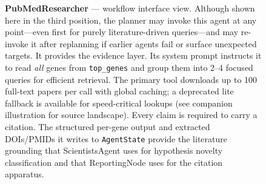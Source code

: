 \begin{figure}[htbp]
{%
}%
\caption{\textbf{PubMedResearcher} --- workflow interface view.
Although shown here in the third position, the planner may invoke
this agent at any point---even first for purely literature-driven
queries---and may re-invoke it after replanning if earlier agents
fail or surface unexpected targets.  It provides the evidence layer.
Its system prompt instructs it to read \emph{all} genes from
\texttt{top\_genes} and group them into 2--4 focused queries for
efficient retrieval.  The primary tool downloads up to 100 full-text
papers per call with global caching; a deprecated lite fallback is
available for speed-critical lookups (see companion illustration for
source landscape).  Every claim is required to carry a citation.  The
structured per-gene output and extracted DOIs/PMIDs it writes
to \texttt{AgentState} provide the literature grounding that
ScientistsAgent uses for hypothesis novelty classification and
that ReportingNode uses for the citation apparatus.}
\label{fig:closeup-pubmed}
\end{figure}
